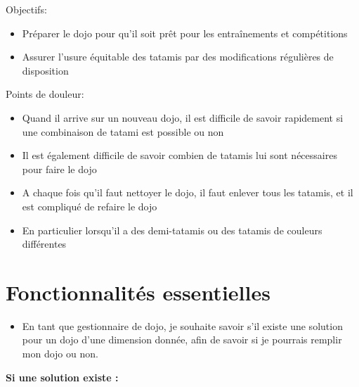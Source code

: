 Objectifs:
\begin{itemize}
    \item Préparer le dojo pour qu’il soit prêt pour les entraînements et compétitions
    \item Assurer l’usure équitable des tatamis par des modifications régulières de disposition
\end{itemize}

Points de douleur:
\begin{itemize}
    \item Quand il arrive sur un nouveau dojo, il est difficile de savoir rapidement si une 
    combinaison de tatami est possible ou non
    \item Il est également difficile de savoir combien de tatamis lui sont nécessaires pour 
    faire le dojo
    \item A chaque fois qu’il faut nettoyer le dojo, il faut enlever tous les tatamis, et 
    il est compliqué de refaire le dojo
    \item En particulier lorsqu’il a des demi-tatamis ou des tatamis de couleurs différentes

\end{itemize}



\section{Fonctionnalités essentielles}


\begin{itemize}
    \item En tant que gestionnaire de dojo, je souhaite savoir s’il existe une solution pour
     un dojo d'une dimension donnée, afin de savoir si je pourrais remplir mon dojo ou non.
\end{itemize}

\textbf{ Si une solution existe :}

